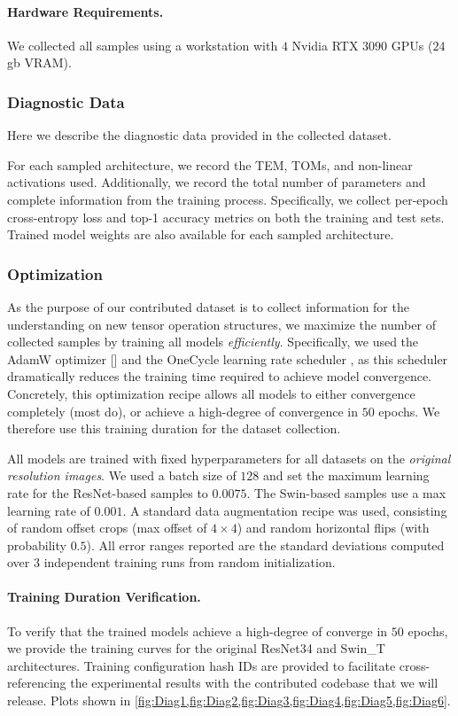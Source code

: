 \documentclass{article}
\theoremstyle{plain}
\theoremstyle{definition}
\theoremstyle{remark}
\newcommand{\citenump}[1]{[\citenum{#1}]}
\let\oldparagraph\paragraph
\renewcommand{\paragraph}[1]{%
	\vspace{-0.5em}%
	\oldparagraph{#1}%
}
\begin{document}
\paragraph{Hardware Requirements.} We collected all samples using a workstation with $4$ Nvidia RTX $3090$ GPUs ($24$gb VRAM).
\clearpage
\subsubsection{\label{sec:DataCollection_DiagData}Diagnostic Data}
Here we describe the diagnostic data provided in the collected dataset.

For each sampled architecture, we record the TEM, TOMs, and non-linear activations used. Additionally, we record the total number of parameters and complete information from the training process. Specifically, we collect per-epoch cross-entropy loss and top-1 accuracy metrics on both the training and test sets. Trained model weights are also available for each sampled architecture.

\subsubsection{\label{sec:DataCollection_Optim}Optimization}
As the purpose of our contributed dataset is to collect information for the understanding on new tensor operation structures, we maximize the number of collected samples by training all models \textit{efficiently}. Specifically, we used the AdamW optimizer \citenump{Adam} and the OneCycle learning rate scheduler , as this scheduler dramatically reduces the training time required to achieve model convergence. Concretely, this optimization recipe allows all models to either convergence completely (most do), or achieve a high-degree of convergence in $50$ epochs. We therefore use this training duration for the dataset collection.

All models are trained with fixed hyperparameters for all datasets on the \textit{original resolution images}. We used a batch size of $128$ and set the maximum learning rate for the ResNet-based samples to $0.0075$. The Swin-based samples use a max learning rate of $0.001$. A standard data augmentation recipe was used, consisting of random offset crops (max offset of $4 \times 4$) and random horizontal flips (with probability $0.5$). All error ranges reported are the standard deviations computed over $3$ independent training runs from random initialization.

\paragraph{Training Duration Verification.} To verify that the trained models achieve a high-degree of converge in $50$ epochs, we provide the training curves for the original ResNet34 and Swin\_T architectures. Training configuration hash IDs are provided to facilitate cross-referencing the experimental results with the contributed codebase that we will release. Plots shown in \cref{fig:Diag1,fig:Diag2,fig:Diag3,fig:Diag4,fig:Diag5,fig:Diag6}.
\end{document}
